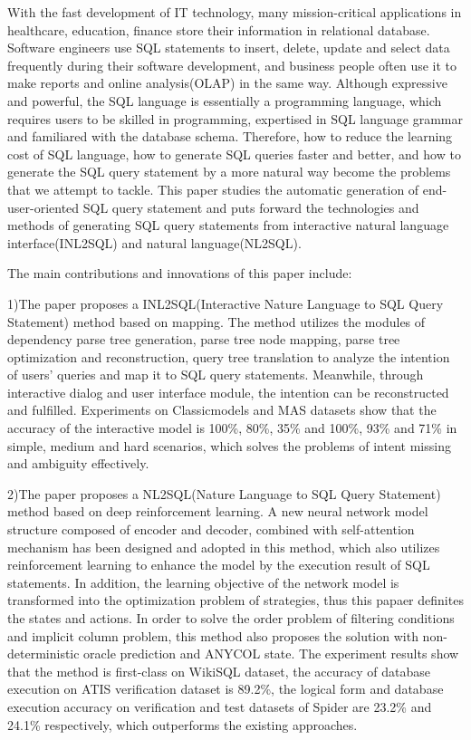\begin{englishabstract}
With the fast development of IT technology, many mission-critical applications in healthcare, education, finance store their information in relational database.
Software engineers use SQL statements to insert, delete, update and select data frequently during their software development, and business people often use it to make reports and online analysis(OLAP) in the same way.
Although expressive and powerful, the SQL language is essentially a programming language, which requires users to be skilled in programming, expertised in SQL language grammar and familiared with the database schema.
Therefore, how to reduce the learning cost of SQL language, how to generate SQL queries faster and better, and how to generate the SQL query statement by a more natural way become the problems that we attempt to tackle.
This paper studies the automatic generation of end-user-oriented SQL query statement and puts forward the technologies and methods of generating SQL query statements from interactive natural language interface(INL2SQL) and natural language(NL2SQL).

The main contributions and innovations of this paper include:

1)The paper proposes a INL2SQL(Interactive Nature Language to SQL Query Statement) method based on mapping.
The method utilizes the modules of dependency parse tree generation, parse tree node mapping, parse tree optimization and reconstruction, query tree translation to analyze the intention of users' queries and map it to SQL query statements.
Meanwhile, through interactive dialog and user interface module, the intention can be reconstructed and fulfilled.
Experiments on Classicmodels and MAS datasets show that the accuracy of the interactive model is 100\%, 80\%, 35\% and 100\%, 93\% and 71\% in simple, medium and hard scenarios, which solves the problems of intent missing and ambiguity effectively.

2)The paper proposes a NL2SQL(Nature Language to SQL Query Statement) method based on deep reinforcement learning.
A new neural network model structure composed of encoder and decoder, combined with self-attention mechanism has been designed and adopted in this method, which also utilizes reinforcement learning to enhance the model by the execution result of SQL statements.
In addition, the learning objective of the network model is transformed into the optimization problem of strategies, thus this papaer definites the states and actions.
In order to solve the order problem of filtering conditions and implicit column problem, this method also proposes the solution with non-deterministic oracle prediction and ANYCOL state.
The experiment results show that the method is first-class on WikiSQL dataset, the accuracy of database execution on ATIS verification dataset is 89.2\%, the logical form and database execution accuracy on verification and test datasets of Spider are 23.2\% and 24.1\% respectively, which outperforms the existing approaches.


\end{englishabstract}

